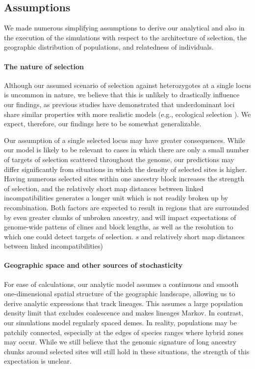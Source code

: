 \documentclass[11pt,letterpaper]{article}
\begin{document}
\subsection*{Assumptions}

We made numerous simplifying assumptions to derive our analytical and also in the execution of the simulations with respect to the architecture of selection, the geographic distribution of populations, and relatedness of individuals.

\paragraph{The nature of selection}
Although our assumed scenario of selection against heterozygotes at a single locus is uncommon in nature, we believe that this is unlikely to drastically influence our findings, as previous studies have demonstrated that underdominant loci share similar properties with more realistic models (e.g., ecological selection \citep{Barton1989,Barton1993}). 
We expect, therefore, our findings here to be somewhat generalizable. 

Our assumption of a single selected locus may have greater consequences. While our model is likely to be relevant to cases in which there are only a small number of targets of selection scattered throughout the genome, our predictions may differ significantly from situations in which the density of selected sites is higher. 
Having numerous selected sites within one ancestry block increases the strength of selection, and the relatively short map distances between linked incompatibilities generates a longer unit which is not readily broken up by recombination. Both factors are expected to result in regions that are surrounded by even greater chunks of unbroken ancestry, and will impact expectations of genome-wide pattens of clines and block lengths, as well as the resolution to which one could detect targets of selection. 
 $s$ and relatively short map distances between linked incompatibilities)
 

\paragraph{Geographic space and other sources of stochasticity}
For ease of calculations, our analytic model assumes a continuous and smooth one-dimensional spatial structure of the geographic landscape, allowing us to derive analytic expressions that track lineages. 
This assumes a large population density limit that excludes coalescence and makes lineages Markov.  
In contrast, our simulations model regularly spaced demes. 
In reality, populations may be patchily connected, especially at the edges of species ranges where hybrid zones may occur. 
While we still believe that the genomic signature of long ancestry chunks around selected sites will still hold in these situations, the strength of this expectation is unclear. 
\end{document}
